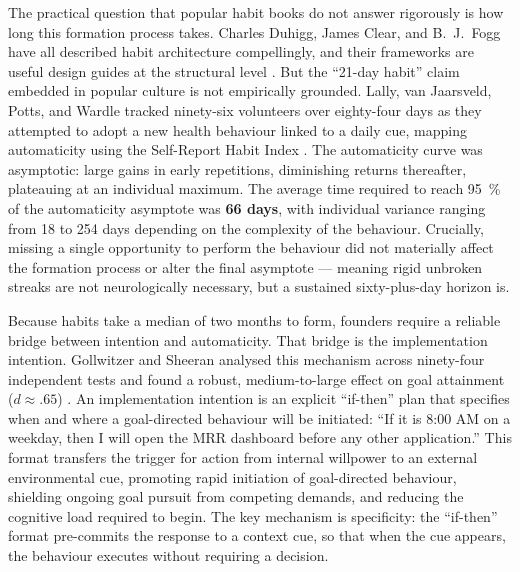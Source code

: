 The practical question that popular habit books do not answer rigorously is how long this
formation process takes. Charles Duhigg, James Clear, and B.\ J.\ Fogg have all described habit
architecture compellingly, and their frameworks are useful design guides at the structural level
\parencite{duhigg2012power,clear2018atomic,fogg2020tiny}. But the ``21-day habit'' claim
embedded in popular culture is not empirically grounded. Lally, van Jaarsveld, Potts, and Wardle
tracked ninety-six volunteers over eighty-four days as they attempted to adopt a new health
behaviour linked to a daily cue, mapping automaticity using the Self-Report Habit Index
\parencite{lally2010habit}. %
The automaticity curve was asymptotic: large gains in early repetitions, diminishing returns
thereafter, plateauing at an individual maximum. The average time required to reach
\qty{95}{\percent} of the automaticity asymptote was \textbf{66 days}, with individual variance
ranging from 18 to 254 days depending on the complexity of the behaviour. Crucially, missing a
single opportunity to perform the behaviour did not materially affect the formation process or
alter the final asymptote --- meaning rigid unbroken streaks are not neurologically necessary,
but a sustained sixty-plus-day horizon is.

Because habits take a median of two months to form, founders require a reliable bridge between
intention and automaticity. That bridge is the implementation intention. Gollwitzer and Sheeran
analysed this mechanism across ninety-four independent tests and found a robust, medium-to-large
effect on goal attainment ($d \approx .65$) \parencite{gollwitzer2006implementation}.
An implementation intention is an explicit ``if-then'' plan that specifies when and where a
goal-directed behaviour will be initiated: ``If it is 8:00 AM on a weekday, then I will open the
MRR dashboard before any other application.'' This format transfers the trigger for action from
internal willpower to an external environmental cue, promoting rapid initiation of goal-directed
behaviour, shielding ongoing goal pursuit from competing demands, and reducing the cognitive load
required to begin. The key mechanism is specificity: the ``if-then'' format pre-commits the
response to a context cue, so that when the cue appears, the behaviour executes without
requiring a decision.


